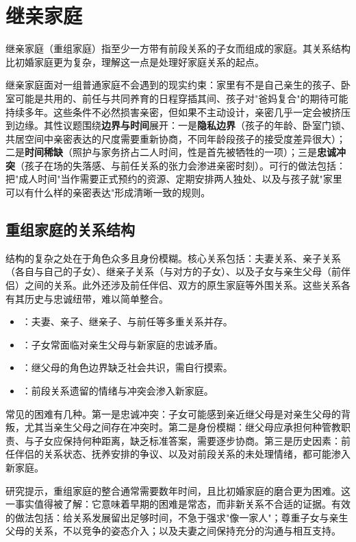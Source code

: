 \section{继亲家庭}

继亲家庭（重组家庭）指至少一方带有前段关系的子女而组成的家庭。其关系结构比初婚家庭更为复杂，理解这一点是处理好家庭关系的起点。

继亲家庭面对一组普通家庭不会遇到的现实约束：家里有不是自己亲生的孩子、卧室可能是共用的、前任与共同养育的日程穿插其间、孩子对"爸妈复合"的期待可能持续多年。这些条件不必然损害亲密，但如果不主动设计，亲密几乎一定会被挤压到边缘。其性议题围绕\textbf{边界与时间}展开：一是\textbf{隐私边界}（孩子的年龄、卧室门锁、共居空间中亲密表达的尺度需要重新协商，不同年龄段孩子的接受度差异很大）；二是\textbf{时间稀缺}（照护与家务挤占二人时间，性是首先被牺牲的一项）；三是\textbf{忠诚冲突}（孩子在场的失落感、与前任关系的张力会渗进亲密时刻）。可行的做法包括：把"成人时间"当作需要正式预约的资源、定期安排两人独处、以及与孩子就"家里可以有什么样的亲密表达"形成清晰一致的规则。

\subsection{重组家庭的关系结构}

结构的复杂之处在于角色众多且身份模糊。核心关系包括：夫妻关系、亲子关系（各自与自己的子女）、继亲子关系（与对方的子女）、以及子女与亲生父母（前伴侣）之间的关系。此外还涉及前任伴侣、双方的原生家庭等外围关系。这些关系各有其历史与忠诚纽带，难以简单整合。

\begin{itemize}
  \item {}：夫妻、亲子、继亲子、与前任等多重关系并存。
  \item {}：子女常面临对亲生父母与新家庭的忠诚矛盾。
  \item {}：继父母的角色边界缺乏社会共识，需自行摸索。
  \item {}：前段关系遗留的情绪与冲突会渗入新家庭。
\end{itemize}

常见的困难有几种。第一是忠诚冲突：子女可能感到亲近继父母是对亲生父母的背叛，尤其当亲生父母之间存在冲突时。第二是身份模糊：继父母应承担何种管教职责、与子女应保持何种距离，缺乏标准答案，需要逐步协商。第三是历史因素：前任伴侣的关系状态、抚养安排的争议、以及对前段关系的未处理情绪，都可能渗入新家庭。

研究提示，重组家庭的整合通常需要数年时间，且比初婚家庭的磨合更为困难。这一事实值得被了解：它意味着早期的困难是常态，而非新关系不合适的证据。有效的做法包括：给关系发展留出足够时间，不急于强求"像一家人"；尊重子女与亲生父母的关系，不以竞争的姿态介入；以及夫妻之间保持充分的沟通与相互支持。

